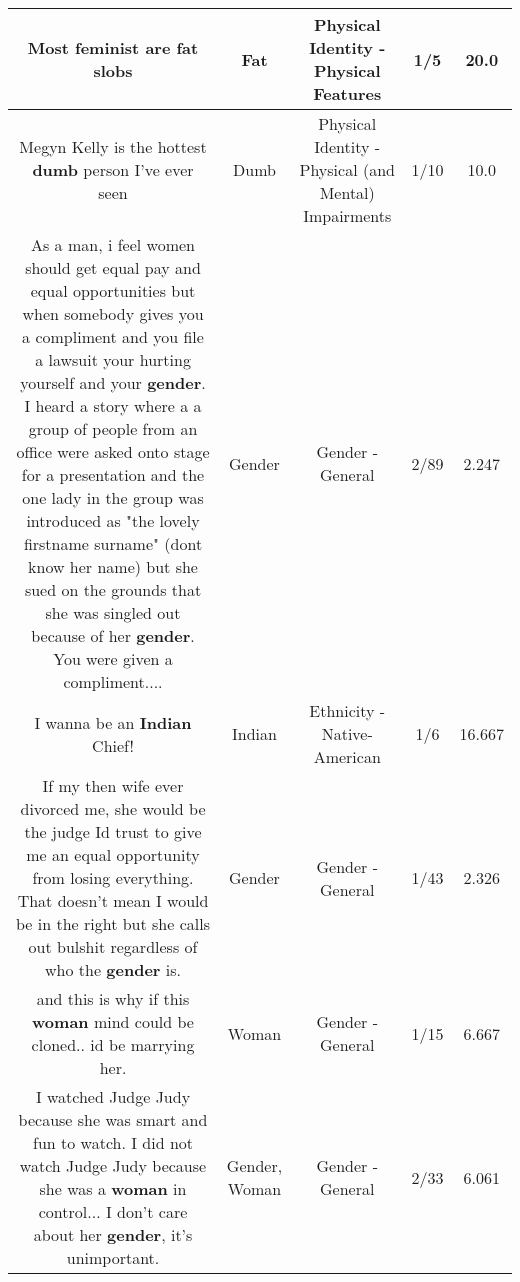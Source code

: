 \documentclass[11pt]{article}
\newlength\mylength
\begin{document}
\begin{center}
\begin{longtable}{|C{.65\mylength}|C{.30\mylength}|C{.12\mylength}|C{.12\mylength}|C{.12\mylength}|}
  \small Most feminist are \textbf{fat} slobs\normalsize   & Fat & Physical Identity - Physical Features & 1/5 & 20.0 \\  \hline
  \small Megyn Kelly is the hottest \textbf{dumb} person I've ever seen\normalsize   & Dumb & Physical Identity - Physical (and Mental) Impairments & 1/10 & 10.0 \\  \hline
  \small As a man, i feel women should get equal pay and equal opportunities but when somebody gives you a compliment and you file a lawsuit your hurting yourself and your \textbf{gender}. I heard a story where a a group of people from an office were asked onto stage for a presentation and the one lady in the group was introduced as "the lovely firstname surname" (dont know her name) but she sued on the grounds that she was singled out because of her \textbf{gender}. You were given a compliment....\normalsize   & Gender & Gender - General & 2/89 & 2.247 \\  \hline
  \small I wanna be an \textbf{Indian} Chief!\normalsize   & Indian & Ethnicity - Native-American & 1/6 & 16.667 \\  \hline
  \small If my then wife ever divorced me, she would be the judge Id trust to give me an equal opportunity from losing everything. That doesn't mean I would be in the right but she calls out bulshit regardless of who the \textbf{gender} is.\normalsize   & Gender & Gender - General & 1/43 & 2.326 \\  \hline
  \small and this is why if this \textbf{woman} mind could be cloned.. id be marrying her.\normalsize   & Woman & Gender - General & 1/15 & 6.667 \\  \hline
  \small I watched Judge Judy because she was smart and fun to watch. I did not watch Judge Judy because she was a \textbf{woman} in control... I don't care about her \textbf{gender}, it's unimportant.\normalsize   & Gender, Woman & Gender - General & 2/33 & 6.061 \\  \hline

\end{longtable}
\end{center}
\end{document}
